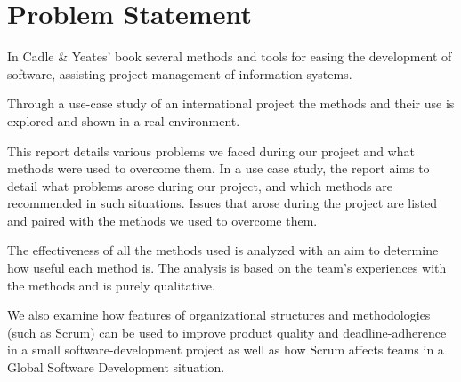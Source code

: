 \section{Problem Statement}
\label{sec:problemstatement}
In Cadle \& Yeates' book \cite{caye} several methods and tools for easing the
development of software, assisting project management of information systems.

Through a use-case study of an international project the methods and their use
is explored and shown in a real environment.

This report details various problems we faced during our project and what
methods were used to overcome them. In a use case study, the report aims to
detail what problems arose during our project, and which methods are
recommended in such situations.  Issues that arose during the project are
listed and paired with the methods we used to overcome them.

The effectiveness of all the methods used is analyzed with an aim to determine
how useful each method is. The analysis is based on the team’s experiences with
the methods and is purely qualitative.

We also examine how features of organizational structures and methodologies
(such as Scrum) can be used to improve product quality and deadline-adherence
in a small software-development project as well as how Scrum affects teams in
a Global Software Development situation.
